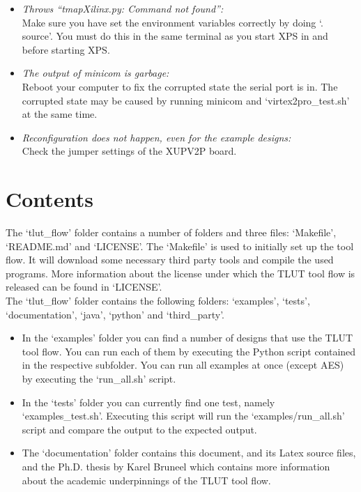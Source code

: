 \documentclass[a4paper,oneside]{memoir}
\begin{document}
\begin{itemize}
\item \emph{Throws ``tmapXilinx.py: Command not found'':}\\
Make sure you have set the environment variables correctly by doing `. source'. You must do this in the same terminal as you start XPS in and before starting XPS.
\item \emph{The output of minicom is garbage:}\\
Reboot your computer to fix the corrupted state the serial port is in. The corrupted state may be caused by running minicom and `virtex2pro\_test.sh' at the same time.
\item \emph{Reconfiguration does not happen, even for the example designs:}\\
Check the jumper settings of the XUPV2P board.
\end{itemize}



\clearpage
\chapter{Contents}\label{sec:contents}
The `tlut\_flow' folder contains a number of folders and three files: `Makefile', `README.md' and `LICENSE'. 
The `Makefile' is used to initially set up the tool flow. It will download  some necessary third party tools and compile the used programs.
More information about the license under which the TLUT tool flow is released can be found in `LICENSE'.\\

The `tlut\_flow' folder contains the following folders:  `examples', `tests', `documentation',  `java', `python' and `third\_party'.

\begin{itemize}
\item In the `examples' folder you can find a number of designs that use the TLUT tool flow. You can run each of them by executing the Python script contained in the respective subfolder. You can run all examples at once (except AES) by executing the `run\_all.sh' script.
\item In the `tests' folder you can currently find one test, namely `examples\_test.sh'. Executing this script will run the `examples/run\_all.sh' script and compare the output to the expected output.
\item The `documentation' folder contains this document, and its Latex source files, and the Ph.D. thesis by Karel Bruneel which contains more information about the academic underpinnings of the TLUT tool flow.
\end{itemize}
\end{document}
